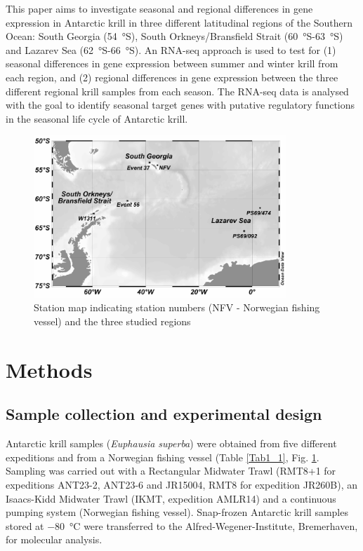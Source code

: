 This paper aims to investigate seasonal and regional differences in gene
expression in Antarctic krill in three different latitudinal regions of the
Southern Ocean: South Georgia (\SI{54}{\degree}S), South Orkneys/Bransfield
Strait (\SI{60}{\degree}S-\SI{63}{\degree}S) and Lazarev Sea
(\SI{62}{\degree}S-\SI{66}{\degree}S). An RNA-seq approach is used to test for
(1) seasonal differences in gene expression between summer and winter krill
from each region, and (2) regional differences in gene expression between the
three different regional krill samples from each season. The RNA-seq data is
analysed with the goal to identify seasonal target genes with putative
regulatory functions in the seasonal life cycle of Antarctic krill.

\begin{figure}[ht!] 
        \centering
        \includegraphics[width=0.85\textwidth]{../Figures/Pub1_1.pdf} 
        \caption{Station map indicating station numbers (NFV - Norwegian fishing vessel) and the three
studied regions} 
        \label{Pub1_1} 
\end{figure}

\section{Methods}

\subsection{Sample collection and experimental design}

Antarctic krill samples (\textit{Euphausia superba}) were obtained from five
different expeditions and from a Norwegian fishing vessel (Table \ref{Tab1_1},
Fig. \ref{Pub1_1}.  Sampling was carried out with a Rectangular Midwater Trawl
(RMT8+1 for expeditions ANT23-2, ANT23-6 and JR15004, RMT8 for expedition
JR260B), an Isaacs-Kidd Midwater Trawl (IKMT, expedition AMLR14) and a
continuous pumping system (Norwegian fishing vessel). Snap-frozen Antarctic
krill samples stored at \SI{-80}{\celsius} were transferred to the
Alfred-Wegener-Institute, Bremerhaven, for molecular analysis.



